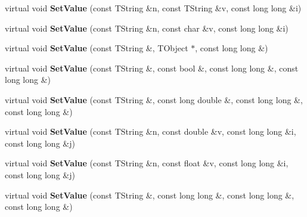 \begin{DoxyCompactItemize}
\item 
\hypertarget{class_h_a_l_1_1_analysis_data_a985317d132d7c150e61f869db7fa8197}{virtual void {\bfseries Set\+Value} (const T\+String \&n, const T\+String \&v, const long long \&i)}\label{class_h_a_l_1_1_analysis_data_a985317d132d7c150e61f869db7fa8197}

\item 
\hypertarget{class_h_a_l_1_1_analysis_data_ae67a81418f6b826dd9b04f4c1e6f6f43}{virtual void {\bfseries Set\+Value} (const T\+String \&n, const char \&v, const long long \&i)}\label{class_h_a_l_1_1_analysis_data_ae67a81418f6b826dd9b04f4c1e6f6f43}

\item 
\hypertarget{class_h_a_l_1_1_analysis_data_adb01a8781d1c24a520bcc1b2518b64d2}{virtual void {\bfseries Set\+Value} (const T\+String \&, T\+Object $\ast$, const long long \&)}\label{class_h_a_l_1_1_analysis_data_adb01a8781d1c24a520bcc1b2518b64d2}

\item 
\hypertarget{class_h_a_l_1_1_analysis_data_a8d9a745e5e829f20b1e2e5fd5651b5cb}{virtual void {\bfseries Set\+Value} (const T\+String \&, const bool \&, const long long \&, const long long \&)}\label{class_h_a_l_1_1_analysis_data_a8d9a745e5e829f20b1e2e5fd5651b5cb}

\item 
\hypertarget{class_h_a_l_1_1_analysis_data_ad81a9423de201ecd3993c69c4cbefe6c}{virtual void {\bfseries Set\+Value} (const T\+String \&, const long double \&, const long long \&, const long long \&)}\label{class_h_a_l_1_1_analysis_data_ad81a9423de201ecd3993c69c4cbefe6c}

\item 
\hypertarget{class_h_a_l_1_1_analysis_data_a53d8939f8a64262857f13025f1f040da}{virtual void {\bfseries Set\+Value} (const T\+String \&n, const double \&v, const long long \&i, const long long \&j)}\label{class_h_a_l_1_1_analysis_data_a53d8939f8a64262857f13025f1f040da}

\item 
\hypertarget{class_h_a_l_1_1_analysis_data_a0089459ec31db3ea3c5dd974502ba651}{virtual void {\bfseries Set\+Value} (const T\+String \&n, const float \&v, const long long \&i, const long long \&j)}\label{class_h_a_l_1_1_analysis_data_a0089459ec31db3ea3c5dd974502ba651}

\item 
\hypertarget{class_h_a_l_1_1_analysis_data_a04aaec235f3100f4324bc502764fe00f}{virtual void {\bfseries Set\+Value} (const T\+String \&, const long long \&, const long long \&, const long long \&)}\label{class_h_a_l_1_1_analysis_data_a04aaec235f3100f4324bc502764fe00f}


\end{DoxyCompactItemize}
